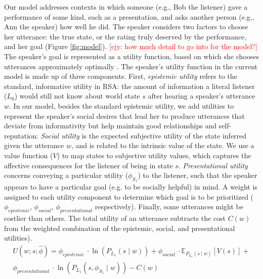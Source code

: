 \documentclass[12pt]{article}
\newcommand{\ejy}[1]{\textcolor{Red}{[ejy: #1]}}
\begin{document}
Our model addresses contexts in which
someone (e.g., Bob the listener) gave a performance of some kind, such as a presentation, 
and asks another person (e.g., Ann the speaker) how well he did. 
The speaker considers two factors to choose her utterance: 
the true state, or the rating truly deserved by the performance, 
and her goal (Figure \ref{fig:model}). \ejy{how much detail to go into for the model?}
The speaker's goal is represented as a utility function, 
based on which she chooses utterances approximately optimally \cite{goodman2013}. 
The speaker's utility function in the current model is made up of three components.
First, \emph{epistemic utility} refers to the standard, informative utility in RSA: 
the amount of information a literal listener (\(L_0\)) would still not know about world state \(s\) after hearing a speaker's utterance \(w\).
In our model, besides the standard epistemic utility, 
we add utilities to represent the speaker's social desires that lead her to produce utterances that deviate from informativity 
but help maintain good relationships and self-reputation:
\emph{Social utility} is the expected subjective utility of the state inferred given the utterance \(w\), 
and is related to the intrinsic value of the state.
We use a value function (\(V\)) to map states to subjective utility values,
which captures the affective consequences for the listener of being in state \(s\). 
\emph{Presentational utility} concerns conveying a particular utility (\(\phi_{S_1}\)) to the listener, 
such that the speaker appears to have a particular goal (e.g. to be socially helpful) in mind.
A weight is assigned to each utility component to determine which goal is to be prioritized (\(\phi_{epistemic}\), \(\phi_{social}\), \(\phi_{presentational}\) respectively). 
Finally, some utterances might be costlier than others. 
The total utility of an utterance subtracts the cost $C(w)$ from the weighted combination of the epistemic, social, and presentational utilities). 
\begin{multline}
U(w;s; \hat{\phi}) =  \phi_{epistemic}\ \cdot \ln(P_{L_1}(s \mid w))  +
\phi_{social}\ \cdot \mathbb{E}_{P_{L_1}(s \mid w)}[V(s)] + \\
\phi_{presentational}\ \cdot \ln(P_{L_1}(s,  \phi_{S_1} \mid w)) -
C(w)
\end{multline}
\end{document}
